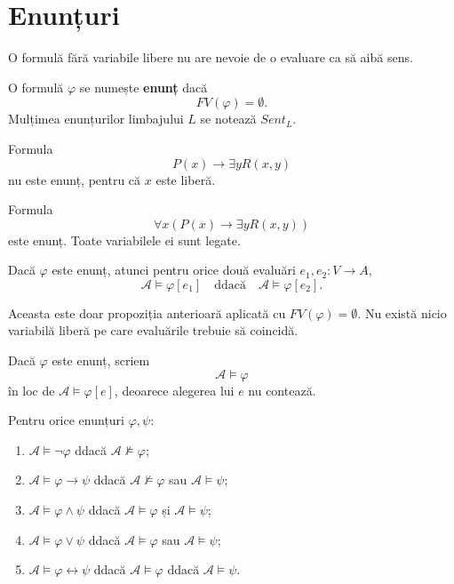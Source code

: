 \section{Enunțuri}

O formulă fără variabile libere nu are nevoie de o evaluare ca să aibă sens.

\begin{definition}
	O formulă \( \varphi \) se numește \textbf{enunț} dacă
	\[
		FV(\varphi)=\emptyset.
	\]
	Mulțimea enunțurilor limbajului \(L\) se notează \(Sent_L\).
\end{definition}

\begin{eg}
	Formula
	\[
		P(x) \to \exists y R(x,y)
	\]
	nu este enunț, pentru că \(x\) este liberă.

	Formula
	\[
		\forall x(P(x) \to \exists y R(x,y))
	\]
	este enunț. Toate variabilele ei sunt legate.
\end{eg}

\begin{prop}
	Dacă \( \varphi \) este enunț, atunci pentru orice două evaluări \(e_1,e_2 : V \to A\),
	\[
		\mathcal{A} \models \varphi[e_1]
		\quad \text{ddacă} \quad
		\mathcal{A} \models \varphi[e_2].
	\]
\end{prop}

Aceasta este doar propoziția anterioară aplicată cu \(FV(\varphi)=\emptyset\). Nu există nicio variabilă liberă pe care evaluările trebuie să coincidă.

\begin{definition}
	Dacă \( \varphi \) este enunț, scriem
	\[
		\mathcal{A} \models \varphi
	\]
	în loc de \( \mathcal{A} \models \varphi[e] \), deoarece alegerea lui \(e\) nu contează.
\end{definition}


\begin{prop}
	Pentru orice enunțuri \( \varphi,\psi \):
	\begin{enumerate}
		\item \( \mathcal{A} \models \neg \varphi \) ddacă \( \mathcal{A} \not\models \varphi \);
		\item \( \mathcal{A} \models \varphi \to \psi \) ddacă \( \mathcal{A} \not\models \varphi \) sau \( \mathcal{A} \models \psi \);
		\item \( \mathcal{A} \models \varphi \land \psi \) ddacă \( \mathcal{A} \models \varphi \) și \( \mathcal{A} \models \psi \);
		\item \( \mathcal{A} \models \varphi \lor \psi \) ddacă \( \mathcal{A} \models \varphi \) sau \( \mathcal{A} \models \psi \);
		\item \( \mathcal{A} \models \varphi \leftrightarrow \psi \) ddacă \( \mathcal{A} \models \varphi \) ddacă \( \mathcal{A} \models \psi \).
	\end{enumerate}
\end{prop}

